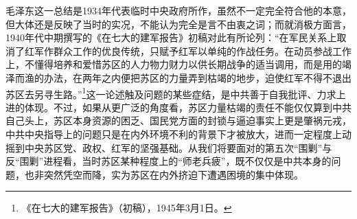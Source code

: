 毛泽东这一总结是1934年代表临时中央政府所作，虽然不一定完全符合他的本意，但大体还是反映了当时的实况，不能认为完全是言不由衷之词；而就消极方面言，1940年代中期撰写的《在七大的建军报告》初稿对此有所论列：“在军民关系上取消了红军作群众工作的优良传统，只赋予红军以单纯的作战任务。在动员参战工作上，不懂得培养和爱惜苏区的人力物力财力以供长期战争的适当调用，而是用的竭泽而渔的办法，在两年之内便把苏区的力量弄到枯竭的地步，迫使红军不得不退出苏区去另寻生路。”\footnote{《在七大的建军报告》（初稿），1945年3月1日。}这一论述触及问题的某些症结，是中共善于自我批评、力求上进的体现。不过，如果从更广泛的角度看，苏区力量枯竭的责任不能仅仅算到中共自己头上，苏区本身资源的困乏、国民党方面的封锁与逼迫事实上更是肇祸元戎，中共中央指导上的问题只是在内外环境不利的背景下才被放大，进而一定程度上动摇到中央苏区党、政权、红军的坚强基础。从我们将要面对的第五次“围剿”与反“围剿”进程看，当时苏区某种程度上的“师老兵疲”，既不仅仅是中共本身的问题，也非突然凭空而降，实为苏区在内外挤迫下遭遇困境的集中体现。

